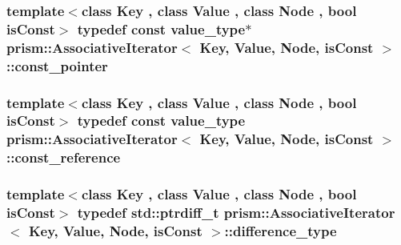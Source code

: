 \subsubsection[{\texorpdfstring{const\+\_\+pointer}{const_pointer}}]{\setlength{\rightskip}{0pt plus 5cm}template$<$class Key , class Value , class Node , bool is\+Const$>$ typedef const {\bf value\+\_\+type}$\ast$ {\bf prism\+::\+Associative\+Iterator}$<$ Key, Value, Node, is\+Const $>$\+::{\bf const\+\_\+pointer}}\hypertarget{structprism_1_1_associative_iterator_ae3b9ad6e27c4f13d0585adf4484e986a}{}\label{structprism_1_1_associative_iterator_ae3b9ad6e27c4f13d0585adf4484e986a}
\subsubsection[{\texorpdfstring{const\+\_\+reference}{const_reference}}]{\setlength{\rightskip}{0pt plus 5cm}template$<$class Key , class Value , class Node , bool is\+Const$>$ typedef const {\bf value\+\_\+type} {\bf prism\+::\+Associative\+Iterator}$<$ Key, Value, Node, is\+Const $>$\+::{\bf const\+\_\+reference}}\hypertarget{structprism_1_1_associative_iterator_af94d581c385f29b0bf624dc03118132d}{}\label{structprism_1_1_associative_iterator_af94d581c385f29b0bf624dc03118132d}
\subsubsection[{\texorpdfstring{difference\+\_\+type}{difference_type}}]{\setlength{\rightskip}{0pt plus 5cm}template$<$class Key , class Value , class Node , bool is\+Const$>$ typedef std\+::ptrdiff\+\_\+t {\bf prism\+::\+Associative\+Iterator}$<$ Key, Value, Node, is\+Const $>$\+::{\bf difference\+\_\+type}}\hypertarget{structprism_1_1_associative_iterator_a9ecd67af2f6f28f29ece181d452f162a}{}\label{structprism_1_1_associative_iterator_a9ecd67af2f6f28f29ece181d452f162a}
